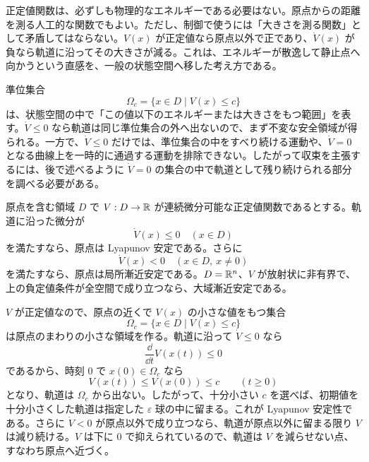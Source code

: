 正定値関数は、必ずしも物理的なエネルギーである必要はない。原点からの距離を測る人工的な関数でもよい。ただし、制御で使うには「大きさを測る関数」として矛盾してはならない。$V(x)$ が正定値なら原点以外で正であり、$\dot{V}(x)$ が負なら軌道に沿ってその大きさが減る。これは、エネルギーが散逸して静止点へ向かうという直感を、一般の状態空間へ移した考え方である。

準位集合
\begin{equation}
  \Omega_c=\{x\in D\mid V(x)\le c\}
\end{equation}
は、状態空間の中で「この値以下のエネルギーまたは大きさをもつ範囲」を表す。$\dot{V}\le0$ なら軌道は同じ準位集合の外へ出ないので、まず不変な安全領域が得られる。一方で、$\dot{V}\le0$ だけでは、準位集合の中をすべり続ける運動や、$\dot{V}=0$ となる曲線上を一時的に通過する運動を排除できない。したがって収束を主張するには、後で述べるように $\dot{V}=0$ の集合の中で軌道として残り続けられる部分を調べる必要がある。

\begin{theorem}
原点を含む領域 $D$ で $V:D\to\mathbb{R}$ が連続微分可能な正定値関数であるとする。軌道に沿った微分が
\begin{equation}
  \dot{V}(x)\le0\quad(x\in D)
\end{equation}
を満たすなら、原点は Lyapunov 安定である。さらに
\begin{equation}
  \dot{V}(x)<0\quad(x\in D,\ x\ne0)
\end{equation}
を満たすなら、原点は局所漸近安定である。$D=\mathbb{R}^n$、$V$ が放射状に非有界で、上の負定値条件が全空間で成り立つなら、大域漸近安定である。
\end{theorem}

\begin{derivation}
$V$ が正定値なので、原点の近くで $V(x)$ の小さな値をもつ集合
\begin{equation}
  \Omega_c=\{x\in D\mid V(x)\le c\}
\end{equation}
は原点のまわりの小さな領域を作る。軌道に沿って $\dot{V}\le0$ なら
\begin{equation}
  \frac{\dd}{\dd t}V(x(t))\le0
\end{equation}
であるから、時刻 $0$ で $x(0)\in\Omega_c$ なら
\begin{equation}
  V(x(t))\le V(x(0))\le c\qquad(t\ge0)
\end{equation}
となり、軌道は $\Omega_c$ から出ない。したがって、十分小さい $c$ を選べば、初期値を十分小さくした軌道は指定した $\varepsilon$ 球の中に留まる。これが Lyapunov 安定性である。さらに $\dot{V}<0$ が原点以外で成り立つなら、軌道が原点以外に留まる限り $V$ は減り続ける。$V$ は下に 0 で抑えられているので、軌道は $V$ を減らせない点、すなわち原点へ近づく。
\end{derivation}

